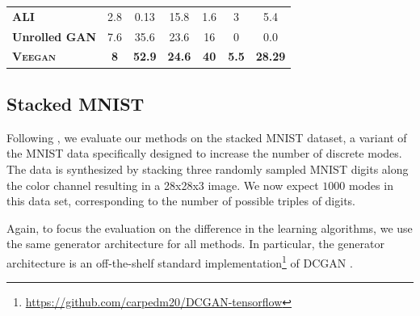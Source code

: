 \documentclass{article}
\newcommand{\acronym}{\textsc{Veegan}\xspace}
\begin{document}
\begin{table}
{\begin{tabular}{@{}lcccccc@{}}
\textbf{ALI}          & 2.8                                                               & 0.13                                                                       & 15.8                                                               & 1.6                                                                        & 3                                                                  & 5.4                                                                        \\ 
\textbf{Unrolled GAN} & 7.6                                                               & 35.6                                                                       & 23.6                                                               & 16                                                                         & 0                                                                  & 0.0                                                                         \\ 
\textbf{\acronym}     & \textbf{8}                                                        & \textbf{52.9}                                                              & \textbf{24.6}                                                      & \textbf{40}                                                                & \textbf{5.5}                                                       & \textbf{28.29}                                                             \\ \bottomrule
\end{tabular}
}
\end{table}



\subsection{Stacked MNIST}

Following \citep{metz2016unrolled}, we evaluate our methods on the stacked MNIST dataset, a variant of the MNIST data specifically
designed to increase the number of discrete modes.
The data is synthesized by stacking three randomly sampled MNIST digits along the color channel resulting in a 28x28x3 image.
We now expect $1000$ modes in this data set,
corresponding to the number of possible triples of digits.
 
Again, to focus the evaluation on the difference in the learning algorithms, we use the same generator architecture
for all methods.
In particular, the generator architecture is an off-the-shelf standard implementation\footnote{\url{https://github.com/carpedm20/DCGAN-tensorflow}} of DCGAN \citep{radford2015unsupervised}.
\end{document}

